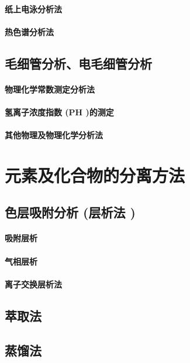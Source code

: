 \documentclass[UTF8]{../03-Chemistry}
\begin{document}
    \subsubsection{纸上电泳分析法}
    \subsubsection{热色谱分析法}
\section{毛细管分析、电毛细管分析}
    \subsubsection{物理化学常数测定分析法}
    \subsubsection{氢离子浓度指数 (PH )的测定}
    \subsubsection{其他物理及物理化学分析法}







\chapter{元素及化合物的分离方法}
\section{色层吸附分析 (层析法 )}
    \subsubsection{吸附层析}
    \subsubsection{气相层析}
    \subsubsection{离子交换层析法}
\section{萃取法}
\section{蒸馏法}
\end{document}
